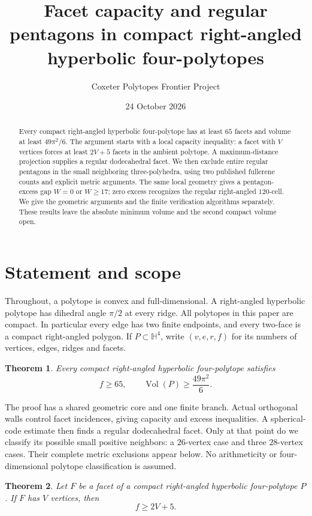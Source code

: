 \documentclass[11pt]{article}
\title{Facet capacity and regular pentagons\linebreak
in compact right-angled hyperbolic four-polytopes}
\author{Coxeter Polytopes Frontier Project}
\date{24 October 2026}
\newtheorem{theorem}{Theorem}
\theoremstyle{remark}
\newcommand{\HH}{\mathbb H}
\newcommand{\Vol}{\operatorname{Vol}}
\begin{document}
\maketitle

\begin{abstract}
Every compact right-angled hyperbolic four-polytope has at least $65$
facets and volume at least $49\pi^2/6$. The argument starts with a local
capacity inequality: a facet with $V$ vertices forces at least $2V+5$
facets in the ambient polytope. A maximum-distance projection supplies a
regular dodecahedral facet. We then exclude entire regular pentagons in
the small neighboring three-polyhedra, using two published fullerene
counts and explicit metric arguments. The same local geometry gives a
pentagon-excess gap $W=0$ or $W\ge17$; zero excess recognizes the regular
right-angled $120$-cell. We give the geometric arguments and the finite
verification algorithms separately. These results leave the absolute
minimum volume and the second compact volume open.
\end{abstract}

\section{Statement and scope}

Throughout, a polytope is convex and full-dimensional. A right-angled
hyperbolic polytope has dihedral angle $\pi/2$ at every ridge. All
polytopes in this paper are compact. In particular every edge has two
finite endpoints, and every two-face is a compact right-angled polygon.
If $P\subset\HH^4$, write $(v,e,r,f)$ for its numbers of vertices,
edges, ridges and facets.

\begin{theorem}\label{thm:global-lower}
Every compact right-angled hyperbolic four-polytope satisfies
\[
 f\ge65,\qquad \Vol(P)\ge\frac{49\pi^2}{6}.
\]
\end{theorem}

The proof has a shared geometric core and one finite branch. Actual
orthogonal walls control facet incidences, giving capacity and excess
inequalities. A spherical-code estimate then finds a regular dodecahedral
facet. Only at that point do we classify its possible small positive
neighbors: a $26$-vertex case and three $28$-vertex cases. Their complete
metric exclusions appear below. No arithmeticity or four-dimensional
polytope classification is assumed.

\begin{theorem}\label{thm:capacity}
Let $F$ be a facet of a compact right-angled hyperbolic four-polytope
$P$. If $F$ has $V$ vertices, then
\begin{equation}\label{eq:capacity}
 f\ge 2V+5.
\end{equation}
\end{theorem}
\end{document}
